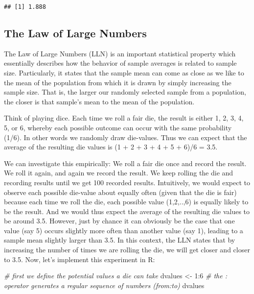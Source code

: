 \documentclass[
  12pt,
]{style/krantz}
\newenvironment{Shaded}{\begin{snugshade}}{\end{snugshade}}
\newcommand{\CommentTok}[1]{\textcolor[rgb]{0.56,0.35,0.01}{\textit{#1}}}
\newcommand{\DecValTok}[1]{\textcolor[rgb]{0.00,0.00,0.81}{#1}}
\newcommand{\NormalTok}[1]{#1}
\newcommand{\OtherTok}[1]{\textcolor[rgb]{0.56,0.35,0.01}{#1}}
\newcommand{\SpecialCharTok}[1]{\textcolor[rgb]{0.00,0.00,0.00}{#1}}
\begin{document}
\begin{verbatim}
## [1] 1.888
\end{verbatim}

\hypertarget{the-law-of-large-numbers}{%
\subsection{The Law of Large Numbers}\label{the-law-of-large-numbers}}

The Law of Large Numbers (LLN) is an important statistical property which essentially describes how the behavior of sample averages is related to sample size. Particularly, it states that the sample mean can come as close as we like to the mean of the population from which it is drawn by simply increasing the sample size. That is, the larger our randomly selected sample from a population, the closer is that sample's mean to the mean of the population.

Think of playing dice. Each time we roll a fair die, the result is either 1, 2, 3, 4, 5, or 6, whereby each possible outcome can occur with the same probability (1/6). In other words we randomly draw die-values. Thus we can expect that the average of the resulting die values is (1 + 2 + 3 + 4 + 5 + 6)/6 = 3.5.

We can investigate this empirically: We roll a fair die once and record the result. We roll it again, and again we record the result. We keep rolling the die and recording results until we get 100 recorded results. Intuitively, we would expect to observe each possible die-value about equally often (given that the die is fair) because each time we roll the die, each possible value (1,2,..,6) is equally likely to be the result. And we would thus expect the average of the resulting die values to be around 3.5. However, just by chance it can obviously be the case that one value (say 5) occurs slightly more often than another value (say 1), leading to a sample mean slightly larger than 3.5. In this context, the LLN states that by increasing the number of times we are rolling the die, we will get closer and closer to 3.5. Now, let's implement this experiment in R:

\begin{Shaded}
\begin{Highlighting}[]
\CommentTok{\# first we define the potential values a die can take}
\NormalTok{dvalues }\OtherTok{\textless{}{-}} \DecValTok{1}\SpecialCharTok{:}\DecValTok{6} \CommentTok{\# the : operator generates a regular sequence of numbers (from:to)}
\NormalTok{dvalues}
\end{Highlighting}
\end{Shaded}
\end{document}

